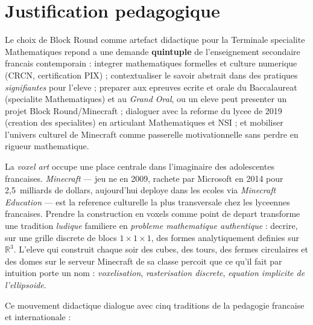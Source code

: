 \documentclass[12pt,a4paper]{scrartcl}
\newcommand{\acc}[1]{\textcolor{accent}{\textbf{#1}}}
\begin{document}
\section{Justification pedagogique}\label{sec:justificativa}

Le choix de Block Round comme artefact didactique pour la Terminale specialite Mathematiques repond a une demande \acc{quintuple} de l'enseignement secondaire francais contemporain : integrer mathematiques formelles et culture numerique (CRCN, certification PIX) ; contextualiser le savoir abstrait dans des pratiques \emph{signifiantes} pour l'eleve ; preparer aux epreuves ecrite et orale du Baccalaureat (specialite Mathematiques) et au \emph{Grand Oral}, ou un eleve peut presenter un projet Block Round/Minecraft ; dialoguer avec la reforme du lycee de 2019 (creation des specialites) en articulant Mathematiques et NSI ; et mobiliser l'univers culturel de Minecraft comme passerelle motivationnelle sans perdre en rigueur mathematique.

La \emph{voxel art} occupe une place centrale dans l'imaginaire des adolescent\textperiodcentered es francais\textperiodcentered es. \emph{Minecraft} --- jeu ne en 2009, rachete par Microsoft en 2014 pour 2,5~milliards de dollars, aujourd'hui deploye dans les ecoles via \emph{Minecraft Education} --- est la reference culturelle la plus transversale chez les lyceen\textperiodcentered nes francais\textperiodcentered es. Prendre la construction en voxels comme point de depart transforme une tradition \emph{ludique} familiere en \emph{probleme mathematique authentique} : decrire, sur une grille discrete de blocs $1\times1\times1$, des formes analytiquement definies sur $\mathbb{R}^3$. L'eleve qui construit chaque soir des cubes, des tours, des fermes circulaires et des domes sur le serveur Minecraft de sa classe percoit que ce qu'il fait par intuition porte un nom : \emph{voxelisation}, \emph{rasterisation discrete}, \emph{equation implicite de l'ellipsoide}.

Ce mouvement didactique dialogue avec cinq traditions de la pedagogie francaise et internationale :
\end{document}
